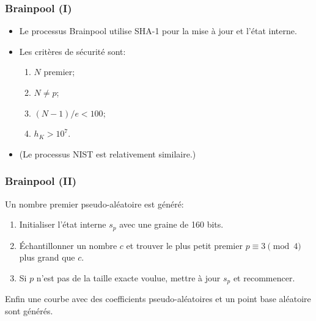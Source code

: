 \documentclass[francais]{beamer}
\begin{document}
\begin{frame}\frametitle{Brainpool (I)}

\begin{itemize}
\item Le processus Brainpool utilise SHA-1 pour la mise à jour et l'état interne.

\bigskip

\item Les critères de sécurité sont:
\begin{enumerate}
\item $N$ premier;
\item $N \neq p$;
\item $(N-1)/e < 100$;
\item $h_K > 10^7$.
\end{enumerate}

\bigskip

\item (Le processus NIST est relativement similaire.)
\end{itemize}
\end{frame}

\begin{frame}\frametitle{Brainpool (II)}
Un nombre premier pseudo-aléatoire est généré:
\begin{enumerate}
\item Initialiser l'état interne $s_p$ avec une  graine de 160 bits.
\item Échantillonner un nombre $c$ et trouver le plus petit premier $p \equiv 3 \pmod{4}$ plus grand que $c$.
\item Si $p$ n'est pas de la taille exacte voulue, mettre à jour $s_p$ et recommencer.
\end{enumerate}

Enfin une courbe avec des coefficients pseudo-aléatoires
et un point base aléatoire sont générés.
\end{frame}
\end{document}

